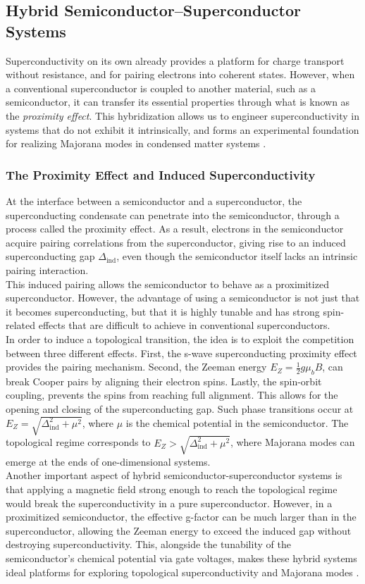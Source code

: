 \documentclass[11pt, letterpaper, titlepage]{article}
\begin{document}
\subsection{Hybrid Semiconductor–Superconductor Systems}
Superconductivity on its own already provides a platform for charge transport without resistance, and for pairing electrons into coherent states. However, when a conventional superconductor is coupled to another material, such as a semiconductor, it can transfer its essential properties through what is known as the \textit{proximity effect}. This hybridization allows us to engineer superconductivity in systems that do not exhibit it intrinsically, and forms an experimental foundation for realizing Majorana modes in condensed matter systems  \cite{Qtech}.
\subsubsection{The Proximity Effect and Induced Superconductivity}
At the interface between a semiconductor and a superconductor, the superconducting condensate can penetrate into the semiconductor, through a process called the proximity effect. As a result, electrons in the semiconductor acquire pairing correlations from the superconductor, giving rise to an induced superconducting gap $Δ_{\mathrm{ind}}$, even though the semiconductor itself lacks an intrinsic pairing interaction.\\
This induced pairing allows the semiconductor to behave as a proximitized superconductor. However, the advantage of using a semiconductor is not just that it becomes superconducting, but that it is highly tunable and has strong spin-related effects that are difficult to achieve in conventional superconductors.\\
In order to induce a topological transition, the idea is to exploit the competition between three different effects. First, the s-wave superconducting proximity effect provides the pairing mechanism. Second, the Zeeman energy $E_Z = \frac{1}{2} g μ_bB$, can break Cooper pairs by aligning their electron spins. Lastly, the spin-orbit coupling, prevents the spins from reaching full alignment. This allows for the opening and closing of the superconducting gap. Such phase transitions occur at $E_Z = \sqrt{Δ_{\mathrm{ind}}^2 + μ^2}$, where $μ$ is the chemical potential in the semiconductor. The topological regime corresponds to $E_Z > \sqrt{Δ_{\mathrm{ind}}^2 + μ^2}$, where Majorana modes can emerge at the ends of one-dimensional systems.\\
Another important aspect of hybrid semiconductor-superconductor systems is that applying a magnetic field strong enough to reach the topological regime would break the superconductivity in a pure superconductor. However, in a proximitized semiconductor, the effective g-factor can be much larger than in the superconductor, allowing the Zeeman energy to exceed the induced gap without destroying superconductivity. This, alongside the tunability of the semiconductor's chemical potential via gate voltages, makes these hybrid systems ideal platforms for exploring topological superconductivity and Majorana modes \cite{Qtech}.\\
\end{document}
